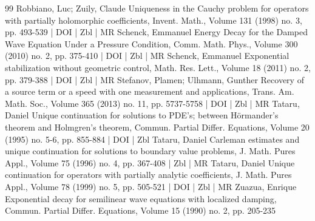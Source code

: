 \documentclass[10pt]{amsart}
\theoremstyle{definition}\newtheorem{defi}[theo]{Definition}\newtheorem{rema}[theo]{Remark}\newtheorem{exam}[theo]{Example}\newtheorem{exem}[theo]{Example}\newtheorem{nota}[theo]{Notation}
\begin{document}
\begin{thebibliography}{99}
Robbiano, Luc; Zuily, Claude Uniqueness in the Cauchy problem for operators with partially holomorphic coefficients, Invent. Math., Volume 131 (1998) no. 3, pp. 493-539 | DOI | Zbl | MR
Schenck, Emmanuel Energy Decay for the Damped Wave Equation Under a Pressure Condition, Comm. Math. Phys., Volume 300 (2010) no. 2, pp. 375-410 | DOI | Zbl | MR
Schenck, Emmanuel Exponential stabilization without geometric control, Math. Res. Lett., Volume 18 (2011) no. 2, pp. 379-388 | DOI | Zbl | MR
Stefanov, Plamen; Ulhmann, Gunther Recovery of a source term or a speed with one measurement and applications, Trans. Am. Math. Soc., Volume 365 (2013) no. 11, pp. 5737-5758 | DOI | Zbl | MR
Tataru, Daniel Unique continuation for solutions to PDE’s; between Hörmander’s theorem and Holmgren’s theorem, Commun. Partial Differ. Equations, Volume 20 (1995) no. 5-6, pp. 855-884 | DOI | Zbl
Tataru, Daniel Carleman estimates and unique continuation for solutions to boundary value problems, J. Math. Pures Appl., Volume 75 (1996) no. 4, pp. 367-408 | Zbl | MR
Tataru, Daniel Unique continuation for operators with partially analytic coefficients, J. Math. Pures Appl., Volume 78 (1999) no. 5, pp. 505-521 | DOI | Zbl | MR
Zuazua, Enrique Exponential decay for semilinear wave equations with localized damping, Commun. Partial Differ. Equations, Volume 15 (1990) no. 2, pp. 205-235
\end{thebibliography}
\end{document}
